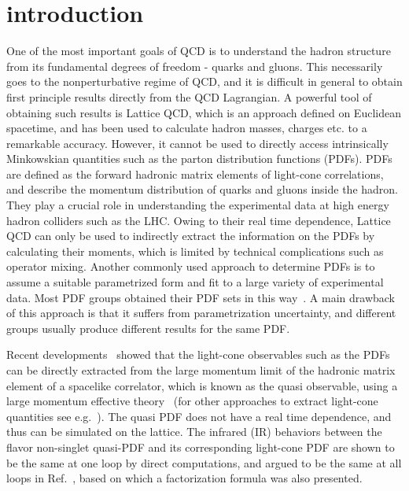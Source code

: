 \section{introduction}
One of the most important goals of QCD is to understand the hadron structure from its fundamental degrees of freedom - quarks and gluons. This necessarily goes to the nonperturbative regime of QCD, and it is difficult in general to obtain first principle results directly from the QCD Lagrangian. A powerful tool of obtaining such results is Lattice QCD, which is an approach defined on Euclidean spacetime, and has been used to calculate hadron masses, charges etc. to a remarkable accuracy. However, it cannot be used to directly access intrinsically Minkowskian quantities such as the parton distribution functions (PDFs). PDFs are defined as the forward hadronic matrix elements of light-cone correlations, and describe the momentum distribution of quarks and gluons inside the hadron. They play a crucial role in understanding the experimental data at high energy hadron colliders such as the LHC. Owing to their real time dependence, Lattice QCD can only be used to indirectly extract the information on the PDFs by calculating their moments, which is limited by technical complications such as operator mixing. Another commonly used approach to determine PDFs is to assume a suitable parametrized form and fit to a large variety of experimental data. Most PDF groups obtained their PDF sets in this way~\cite{Alekhin:2012ig,Gao:2013xoa,Radescu:2010zz,CooperSarkar:2011aa,Martin:2009iq,Ball:2012cx}. A main drawback of this approach is that it suffers from parametrization uncertainty, and different groups usually produce different results for the same PDF.


Recent developments~\cite{Ji:2013fga,Ji:2013dva,Xiong:2013bka,Lin:2014zya,Hatta:2013gta,Ma:2014jla,Ji:2014hxa,Ji:2014gla,Ji:2014lra,
Alexandrou:2015rja,Ji:2015jwa,Ji:2015qla,Xiong:2015nua,Li:2016amo,Chen:2016utp} showed that the light-cone observables such as the PDFs can be directly extracted from the large momentum limit of the hadronic matrix element of a spacelike correlator, which is known as the quasi observable, using a large momentum effective theory~\cite{Ji:2014lra} (for other approaches to extract light-cone quantities see e.g.~\cite{Davoudi:2012ya,Detmold:2005gg,Liu:1993cv,Liu:1998um,Liu:1999ak,Liu:2016djw,Braun:2007wv}). The quasi PDF does not have a real time dependence, and thus can be simulated on the lattice. The infrared (IR) behaviors between the flavor non-singlet quasi-PDF and its corresponding light-cone PDF are shown to be the same at one loop by direct computations, and argued to be the same at all loops in Ref.~\cite{Xiong:2013bka}, based on which a factorization formula was also presented.

